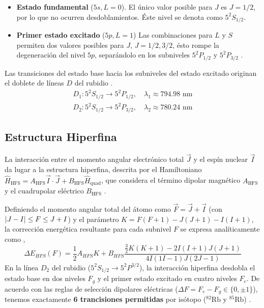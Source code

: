 \begin{itemize}
    \item \textbf{Estado fundamental} ($5s, L=0$).  El único valor posible para $J$ es $J=1/2$, por lo que no ocurren desdoblamientos. Éste nivel se denota como $5^2S_{1/2}$.
    \item \textbf{Primer estado excitado} ($5p, L = 1$) Las combinaciones para $L$ y $S$ permiten dos valores posibles para $J$, $J = 1/2, 3/2$, ésto rompe la degeneración del nivel $5p$, separándolo en los subniveles $5^2P_{1/2}$ y $5^2P_{3/2}$ \cite{footAtomicPhysics2005}. 
\end{itemize}
Las transiciones del estado base hacia los subniveles del estado excitado originan el doblete de líneas $D$ del rubidio \cite{danieladamsteckrubidium85Dlinedata, danieladamsteckrubidium87Dlinedata}.
\begin{equation}
    \begin{split}
        D_1: 5^2S_{1/2} \longrightarrow 5^2P_{1/2}, \quad \lambda_1 \approx 794.98 \text{ nm}\\
        D_2: 5^2S_{1/2} \longrightarrow 5^2P_{3/2}, \quad \lambda_2 \approx 780.24 \text{ nm}
    \end{split}
\end{equation}
\subsection*{Estructura Hiperfina}
La interacción entre el momento angular electrónico total $\vec{J}$ y el espín nuclear $\vec{I}$ da lugar a la estructura hiperfina, descrita por el Hamiltoniano $\hat{H}_{\text{HFS}} = A_{\text{HFS}} \vec{I} \cdot \vec{J} + B_{\text{HFS}} \hat{H}_{\text{quad}}$, que considera el término dipolar magnético $A_{\text{HFS}}$ y el cuadrupolar eléctrico $B_{\text{HFS}}$ \cite{footAtomicPhysics2005}.

Definiendo el momento angular total del átomo como $\vec{F} = \vec{J} + \vec{I}$ (con $\lvert J-I \rvert \leq F \leq J+I$) y el parámetro $K = F(F+1) - J(J+1) - I(I+1)$, la corrección energética resultante para cada subnivel $F$ se expresa analíticamente como \cite{danieladamsteckQuantumAtomOptics2007},
\begin{equation*}
    \Delta E_{HFS} (F) = \frac{1}{2}A_{HFS}K + B_{HFS} \frac{\frac{3}{2}K(K+1) -2I(I+1)J(J+1)}{4I(1I-1)J(2J-1)}
\end{equation*}
En la línea $D_2$ del rubidio ($5^2S_{1/2} \to 5^2P^{3/2}$), la interacción hiperfina desdobla el estado base en dos niveles $F_g$ y el primer estado excitado en cuatro niveles $F_e$. De acuerdo con las reglas de selección dipolares eléctricas ($\Delta F = F_e - F_g \in \{ 0, \pm 1\}$), tenemos exactamente \textbf{6 trancisiones permitidas} por isótopo ($^{82}\text{Rb} \text{ y } ^{85}\text{Rb}$) \cite{siddonsAbsoluteAbsorptionRubidium2008}. 

